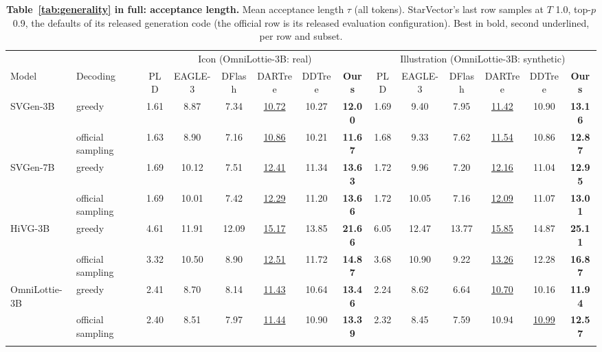 \begin{table}[t]
\caption{\textbf{Table~\ref{tab:generality} in full: acceptance length.} Mean acceptance length $\tau$ (all tokens). StarVector's last row samples at $T$ 1.0, top-$p$ 0.9, the defaults of its released generation code (the official row is its released evaluation configuration). Best in bold, second underlined, per row and subset.}
\label{app:t3-tau}
\centering
\footnotesize
\setlength{\tabcolsep}{2.0pt}
\begin{tabular*}{\textwidth}{@{\extracolsep{\fill}}ll*{12}{c}@{}}
\toprule
 & & \multicolumn{6}{c}{Icon (OmniLottie-3B: real)} & \multicolumn{6}{c}{Illustration (OmniLottie-3B: synthetic)} \\
\cmidrule(lr){3-8}\cmidrule(lr){9-14}
Model & Decoding & PLD & EAGLE-3 & DFlash & DARTree & DDTree & \textbf{Ours} & PLD & EAGLE-3 & DFlash & DARTree & DDTree & \textbf{Ours} \\
\midrule
SVGen-3B & greedy & 1.61 & 8.87 & 7.34 & \underline{10.72} & 10.27 & \textbf{12.00} & 1.69 & 9.40 & 7.95 & \underline{11.42} & 10.90 & \textbf{13.16} \\
 & official sampling & 1.63 & 8.90 & 7.16 & \underline{10.86} & 10.21 & \textbf{11.67} & 1.68 & 9.33 & 7.62 & \underline{11.54} & 10.86 & \textbf{12.87} \\
\addlinespace[2pt]
SVGen-7B & greedy & 1.69 & 10.12 & 7.51 & \underline{12.41} & 11.34 & \textbf{13.63} & 1.72 & 9.96 & 7.20 & \underline{12.16} & 11.04 & \textbf{12.95} \\
 & official sampling & 1.69 & 10.01 & 7.42 & \underline{12.29} & 11.20 & \textbf{13.66} & 1.72 & 10.05 & 7.16 & \underline{12.09} & 11.07 & \textbf{13.01} \\
\addlinespace[2pt]
HiVG-3B & greedy & 4.61 & 11.91 & 12.09 & \underline{15.17} & 13.85 & \textbf{21.66} & 6.05 & 12.47 & 13.77 & \underline{15.85} & 14.87 & \textbf{25.11} \\
 & official sampling & 3.32 & 10.50 & 8.90 & \underline{12.51} & 11.72 & \textbf{14.87} & 3.68 & 10.90 & 9.22 & \underline{13.26} & 12.28 & \textbf{16.87} \\
\addlinespace[2pt]
OmniLottie-3B & greedy & 2.41 & 8.70 & 8.14 & \underline{11.43} & 10.64 & \textbf{13.46} & 2.24 & 8.62 & 6.64 & \underline{10.70} & 10.16 & \textbf{11.94} \\
 & official sampling & 2.40 & 8.51 & 7.97 & \underline{11.44} & 10.90 & \textbf{13.39} & 2.32 & 8.45 & 7.59 & 10.94 & \underline{10.99} & \textbf{12.57} \\
\addlinespace[2pt]

\end{tabular*}
\end{table}
